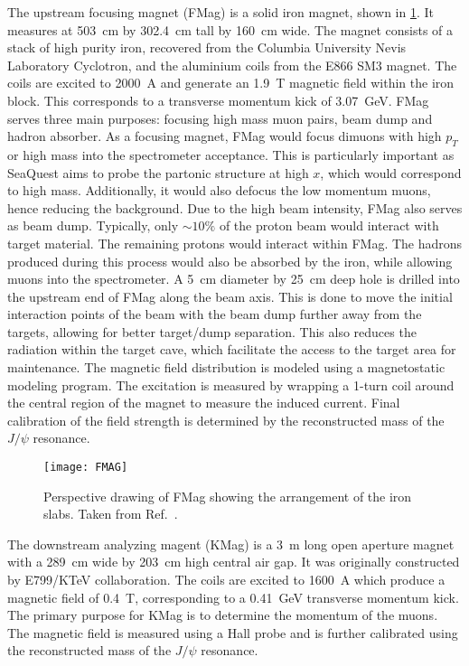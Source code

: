 \documentclass[../main.tex]{subfiles}
\begin{document}
The upstream focusing magnet (FMag) is a solid iron magnet, shown in \cref{fig:fmag}.
It measures at \SI{503}{\cm} by \SI{302.4}{\cm} tall by \SI{160}{\cm} wide.
The magnet consists of a stack of high purity iron, recovered from
the Columbia University Nevis Laboratory Cyclotron, and the aluminium coils from the E866
SM3 magnet. The coils are excited to \SI{2000}{\ampere} and generate an \SI{1.9}{\tesla}
magnetic field within the iron block. This corresponds to a transverse momentum kick of
\SI{3.07}{\GeV}. FMag serves three main purposes: focusing high mass muon pairs, beam
dump and hadron absorber. As a focusing magnet, FMag would focus dimuons with high $p_T$
or high mass into the spectrometer acceptance. This is particularly important as SeaQuest
aims to probe the partonic structure at high $x$, which would correspond to high mass.
Additionally, it would also defocus the low momentum muons, hence reducing the background.
Due to the high beam intensity, FMag also serves as beam dump. Typically, only $\sim 10\%$
of the proton beam would interact with target material. The remaining protons would interact
within FMag. The hadrons produced during this process would also be absorbed by the iron,
while allowing muons into the spectrometer.
A \SI{5}{\cm} diameter by \SI{25}{\cm} deep hole is drilled into the upstream
end of FMag along the beam axis. This is done to move the initial interaction points
of the beam with the beam dump further away from the targets, allowing for better target/dump
separation. This also reduces the radiation within the target cave, which facilitate the
access to the target area for maintenance.
The magnetic field distribution is modeled using a magnetostatic modeling program. The
excitation is measured by wrapping a 1-turn coil around the central region of the magnet to measure the induced
current. Final calibration of the field strength is determined by the reconstructed
mass of the $J/\psi$ resonance.
\begin{figure}[h!]
	\centering
	\texttt{[image: FMAG]}
	\caption{Perspective drawing of FMag showing the arrangement of the iron slabs.
		Taken from Ref.~\cite{aidala2019}.}
	\label{fig:fmag}
\end{figure}

The downstream analyzing magent (KMag) is a \SI{3}{\meter} long open aperture magnet
with a \SI{289}{\cm} wide by \SI{203}{\cm} high central air gap. It was
originally  constructed by E799/KTeV collaboration\cite{alavi-harati2003}.
The coils are excited to \SI{1600}{\ampere} which produce a magnetic field of \SI{0.4}{\tesla},
corresponding to a \SI{0.41}{\GeV} transverse momentum kick. The primary purpose for
KMag is to determine the momentum of the muons. The magnetic field is measured using a Hall
probe and is further calibrated using the reconstructed mass of the $J/\psi$ resonance.
\end{document}
